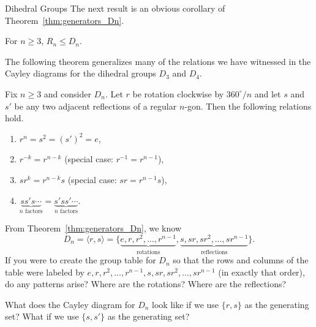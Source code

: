 \begin{section}{Dihedral Groups}
The next result is an obvious corollary of Theorem~\ref{thm:generators_Dn}.

\begin{corollary}
For $n\geq 3$, $R_n\leq D_n$.
\end{corollary}

The following theorem generalizes many of the relations we have witnessed in the Cayley diagrams for the dihedral groups $D_3$ and $D_4$.

\begin{theorem}
Fix $n\geq 3$ and consider $D_n$. Let $r$ be rotation clockwise by $360^{\circ}/n$  and let $s$ and $s'$ be any two adjacent reflections of a regular $n$-gon.  Then the following relations hold.
\begin{enumerate}[label=\rm{(\alph*)}]
\item $r^n = s^2 = (s')^2 =e$,
\item $r^{-k} = r^{n-k}$ (special case: $r^{-1}=r^{n-1}$),
\item $sr^k=r^{n-k}s$ (special case: $sr=r^{n-1}s$),
\item $\underbrace{ss's\cdots}_{n\text{ factors}}=\underbrace{s'ss'\cdots}_{n\text{ factors}}$.
\end{enumerate}
\end{theorem}

\begin{problem}
From Theorem~\ref{thm:generators_Dn}, we know
\[
D_n=\langle r,s\rangle =\{\underbrace{e,r,r^2,\ldots, r^{n-1}}_{\text{rotations}},\underbrace{s,sr,sr^2,\ldots,sr^{n-1}}_{\text{reflections}}\}.
\]
If you were to create the group table for $D_n$ so that the rows and columns of the table were labeled by $e,r,r^2,\ldots, r^{n-1},s,sr,sr^2,\ldots,sr^{n-1}$ (in exactly that order), do any patterns arise?  Where are the rotations? Where are the reflections?
\end{problem}

\begin{problem}
What does the Cayley diagram for $D_n$ look like if we use $\{r,s\}$ as the generating set?  What if we use $\{s,s'\}$ as the generating set?
\end{problem}

\end{section}

